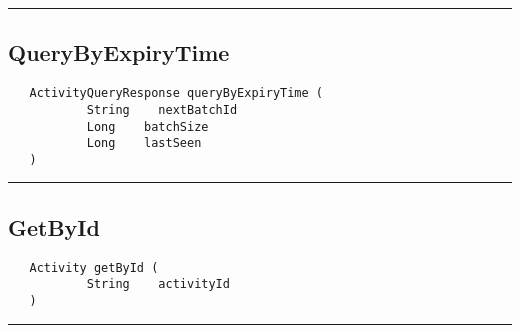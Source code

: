 \rule{15cm}{2pt}
\subsection{QueryByExpiryTime}
\label{Api:QueryByExpiryTime}
\begin{verbatim}
   ActivityQueryResponse queryByExpiryTime (
           String    nextBatchId
           Long    batchSize
           Long    lastSeen
   )
\end{verbatim}



\rule{15cm}{2pt}
\subsection{GetById}
\label{Api:GetById}
\begin{verbatim}
   Activity getById (
           String    activityId
   )
\end{verbatim}



\rule{15cm}{2pt}

